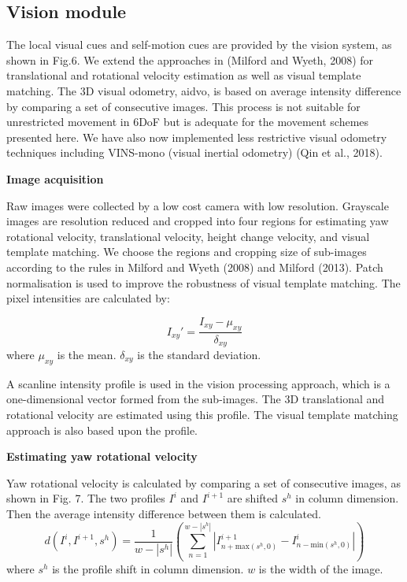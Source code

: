 \subsection{Vision module}

The local visual cues and self-motion cues are provided by the vision system, as shown in Fig.6. 
We extend the approaches in (Milford and Wyeth, 2008) for translational and rotational velocity estimation as well as visual template matching. 
The 3D visual odometry, aidvo, is based on average intensity difference by comparing a set of consecutive images. 
This process is not suitable for unrestricted movement in 6DoF but is adequate for the movement schemes presented here. 
We have also now implemented less restrictive visual odometry techniques including VINS-mono (visual inertial odometry) (Qin et al., 2018).


\textbf{Image acquisition}

Raw images were collected by a low cost camera with low resolution. 
Grayscale images are resolution reduced and cropped into four regions for estimating yaw rotational velocity, translational velocity, height change velocity, and visual template matching. 
We choose the regions and cropping size of sub-images according to the rules in Milford and Wyeth (2008) and Milford (2013). 
Patch normalisation is used to improve the robustness of visual template matching. 
The pixel intensities are calculated by:

\begin{equation}
	I_{xy}' = 
		\frac{I_{xy} - \mu_{xy}}
		{\delta_{xy}}
\end{equation}
where $\mu_{xy}$ is the mean. 
$\delta_{xy}$ is the standard deviation.


A scanline intensity profile is used in the vision processing approach, which is a one-dimensional vector formed from the sub-images. 
The 3D translational and rotational velocity are estimated using this profile. 
The visual template matching approach is also based upon the profile.


\textbf{Estimating yaw rotational velocity}

Yaw rotational velocity is calculated by comparing a set of consecutive images, as shown in Fig. 7. 
The two profiles $I^i$ and $I^{i+1}$ are shifted $s^h$ in column dimension. 
Then the average intensity difference between them is calculated.
\begin{equation}
	d(I^i, I^{i+1}, s^h) = 
		\frac{1}{w-|s^h|}
		(
			\sum_{n=1}^{w-|s^h|}
			|
				I_{n+\text{max}(s^h, 0)} ^{i+1} - 
				I_{n - \text{min}(s^h, 0)} ^i
			|
		)
\end{equation}
where $s^h$ is the profile shift in column dimension. 
$ w $ is the width of the image.

